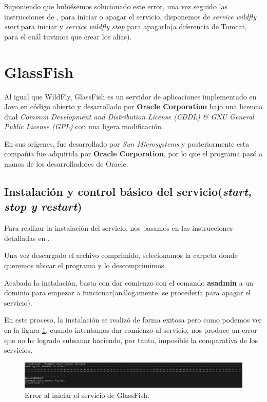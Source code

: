 \documentclass[a4paper, 10pt]{article}
\begin{document}
		Suponiendo que hubiésemos solucionado este error, una vez seguido las instrucciones de
		\cite{WF_install}, para iniciar o apagar el servicio, disponemos de \textit{service
		wildfly start} para iniciar y \textit{service wildfly stop} para apagarlo(a diferencia
		de Tomcat, para el cuál tuvimos que crear los alias).

\section{GlassFish}

	Al igual que WildFly, GlassFish es un servidor de aplicaciones implementado en Java en código
	abierto y desarrollado por \textbf{Oracle Corporation} bajo una licencia dual \textit{Common
	Development and Distribution License (CDDL) \& GNU General Public License (GPL)} con una ligera
	modificación.\cite{GF_official}\cite{GF_install}
	
	En sus orígenes, fue desarrollado por \textit{Sun Microsystems} y posteriormente esta compañía
	fue adquirida por \textbf{Oracle Corporation}, por lo que el programa pasó a manos de los
	desarrolladores de Oracle.

	\subsection{Instalación y control básico del servicio(\textit{start, stop y restart})}
		Para realizar la instalación del servicio, nos basamos en las instrucciones detalladas
		en \cite{GF_install}.
		
		Una vez descargado el archivo comprimido, selecionamos la carpeta donde queremos ubicar
		el programa y lo descomprimimos.
		
		Acabada la instalación, basta con dar comienzo con el comando \textbf{asadmin} a un
		dominio para empezar a funcionar(análogamente, se procedería para apagar el servicio).
		
		En este proceso, la instalación se realizó de forma exitosa pero como podemos ver en la
		figura \ref{fig:GF_Fail}, cuando intentamos dar comienzo al servicio, nos produce un
		error que no he logrado subsanar haciendo, por tanto, imposible la comparativa de los
		servicios.

		\begin{figure}[h!]
			\includegraphics[width=15cm]{Fail_GF.png}
			\caption{Error al iniciar el servicio de GlassFish.}
			\label{fig:GF_Fail}
		\end{figure}
\end{document}
